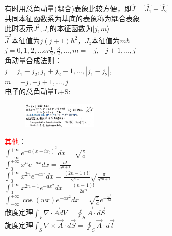 \documentclass[a4paper,8pt]{extarticle} %
\newcommand{\redtext}[1]{\textcolor{red}{#1}}
\begin{document}
\begin{multicols}{3}
有时用总角动量(耦合)表象比较方便，即$\hat{J} = \hat{J_1}+\hat{J_2}$\\
共同本征函数系为基底的表象称为耦合表象\\
此时表示$J^2,J_z$的本征函数为$|j,m\rangle$\\
$\hat{J}^2$本征值为$j(j+1)\hbar^2$，$J_z$本征值为$m\hbar$\\
$j=0,1,2,\dots or \frac{1}{2},\frac{3}{2},\dots, m=-j,-j+1,\dots,j$\\
角动量合成法则：\\$j=j_1+j_2,j_1+j_2-1,\dots,|j_1-j_2|$,
\\$m=-j,-j+1,\dots,j$\\
电子的总角动量L+S:\\
\begin{figure}[H]
    \vspace{-0.5cm}
    \centering
    \includegraphics[width=0.32\textwidth]{images/12.png}
    \vspace{-0.6cm}
\end{figure}

\redtext{其他}：\\
$\int_{-\infty}^{+\infty}e^{-a{(x+ix_0)}^2}dx = \sqrt{\frac{\pi}{a}}$\\
$\int_{0}^{+\infty}x^{n}e^{-ax}dx = \frac{n!}{a^{n+1}}$\\
$\int_{0}^{+\infty}x^{2n}e^{-ax^2}dx = \frac{(2n-1)!!}{2^{n+1}}\sqrt{\frac{\pi}{a^{2n+1}}}$\\
$\int_{0}^{+\infty}x^{2n-1}e^{-ax^2}dx = \frac{(n-1)!}{2a^{n}}$\\
$\int_{-\infty}^{+\infty} \cos(wx)e^{-ax^2}dx = \sqrt{\frac{\pi}{a}}e^{-\frac{w^2}{4a}}$\\
散度定理$\int_V \nabla\cdot\vec{A}dV = \oint_S \vec{A}\cdot d\vec{S}$\\
旋度定理$\int_S \nabla\times\vec{A}\cdot d\vec{S} = \oint_C \vec{A}\cdot d\vec{l}$\\
\end{multicols}
\end{document}
